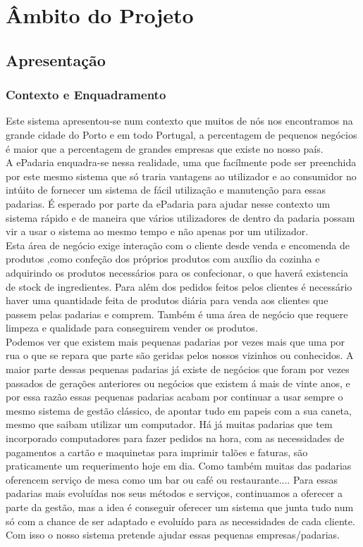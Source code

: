 \chapter{Âmbito do Projeto}
\label{ambito}
\section{Apresentação}
\subsection{Contexto e Enquadramento}
Este sistema apresentou-se num contexto que muitos de nós nos encontramos na grande cidade do Porto e em todo Portugal, a percentagem de pequenos negócios é maior que a percentagem de grandes empresas que existe no nosso país.\\
A ePadaria enquadra-se nessa realidade, uma que facílmente pode ser preenchida por este mesmo sistema que só traria vantagens ao utilizador e ao consumidor no intúito de fornecer um sistema de fácil utilização e manutenção para essas padarias. É esperado por parte da ePadaria para ajudar nesse contexto um sistema rápido e de maneira que vários utilizadores de dentro da padaria possam vir a usar o sistema ao mesmo tempo e não apenas por um utilizador. \\
Esta área de negócio exige interação com o cliente desde venda e encomenda de produtos ,como confeção dos próprios produtos com auxílio da cozinha e adquirindo os produtos necessários para os confecionar, o que haverá existencia de stock de ingredientes. Para além dos pedidos feitos pelos clientes é necessário haver uma quantidade feita de produtos diária para venda aos clientes que passem pelas padarias e comprem. Também é uma área de negócio que requere limpeza e qualidade para conseguirem vender os produtos.\\
 Podemos ver que existem mais pequenas padarias por vezes mais que uma por rua o que se repara que parte são geridas pelos nossos vizinhos ou conhecidos. A maior parte dessas pequenas padarias já existe de negócios que foram por vezes passados de gerações anteriores ou negócios que existem á mais de vinte anos, e por essa razão essas pequenas padarias acabam por continuar a usar sempre o mesmo sistema de gestão clássico, de apontar tudo em papeis com a sua caneta, mesmo que saibam utilizar um computador. Há já muitas padarias que tem incorporado computadores para fazer pedidos na hora, com as necessidades de pagamentos a cartão e maquinetas para imprimir talões e faturas, são praticamente um requerimento hoje em dia. Como também muitas das padarias oferencem serviço de mesa como um bar ou café ou restaurante.... Para essas padarias mais evoluídas nos seus métodos e serviços, continuamos a oferecer a parte da gestão, mas a idea é conseguir oferecer um sistema que junta tudo num só com a chance de ser adaptado e evoluído para as necessidades de cada cliente.
   Com isso o nosso sistema pretende ajudar essas pequenas empresas/padarias.\\




